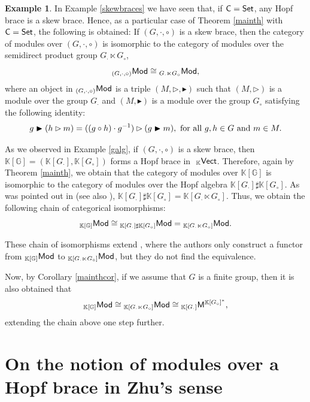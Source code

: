\documentclass[11pt,reqno]{amsart}
\theoremstyle{plain}%
\theoremstyle{definition}
\newtheorem{example}[theorem]{Example}%
\theoremstyle{remark}
\begin{document}
\begin{example}
	In Example \ref{skewbraces} we have seen that, if ${\sf C}={\sf Set}$, any Hopf brace is a skew brace. Hence, as a particular case of Theorem \ref{mainth} with ${\sf C}={\sf Set}$, the following is obtained: If $(G,\cdot,\circ)$ is a skew brace, then the category of modules over $(G,\cdot,\circ)$ is isomorphic to the category of modules over the semidirect product group $G_{\cdot}\ltimes G_{\circ}$, $${}_{(G,\cdot,\circ)}{\sf Mod}\cong{}_{G_{\cdot}\ltimes G_{\circ}}{\sf Mod},$$
	where an object in ${}_{(G,\cdot,\circ)}{\sf Mod}$ is a triple $(M,\rhd,\blacktriangleright)$ such that $(M,\rhd)$ is a module over the group $G_{\cdot}$ and $(M,\blacktriangleright)$ is a module over the group $G_{\circ}$ satisfying the following identity: 
	\[g\blacktriangleright(h\rhd m)=((g\circ h)\cdot g^{-1})\rhd(g\blacktriangleright m),\textnormal{ for all }g,h\in G\textnormal{ and }m\in M.\]
	
As we observed in Example \ref{galg},  if $(G,\cdot,\circ)$ is a skew brace, then  $\mathbb{K}[\mathbb{G}]=(\mathbb{K}[G_{\cdot}],\mathbb{K}[G_{\circ}])$ forms a Hopf brace in $\;_{\mathbb{K}}{\sf Vect}$. Therefore, again by Theorem \ref{mainth}, we obtain that the category of modules over $\mathbb{K}[\mathbb{G}]$ is isomorphic to the category of modules over the Hopf algebra $\mathbb{K}[G_{\cdot}]\sharp \mathbb{K}[G_{\circ}]$. As was pointed out in \cite[Example 3.14]{Maj} (see also \cite{Tak}), $\mathbb{K}[G_{\cdot}]\sharp \mathbb{K}[G_{\circ}]=\mathbb{K}[G_{\cdot}\ltimes G_{\circ}]$. Thus, we obtain the following chain of categorical isomorphisms:
\[{}_{\mathbb{K}[\mathbb{G}]}{\sf Mod}\cong {}_{\mathbb{K}[G_{\cdot}]\sharp \mathbb{K}[G_{\circ}]}{\sf Mod}={}_{\mathbb{K}[G_{\cdot}\ltimes G_{\circ}]}{\sf Mod}.\]

These chain of isomorphisms extend \cite[Remarks 2.2 and 3.2]{KOZTSANG}, where the authors only construct a functor from ${}_{\mathbb{K}[\mathbb{G}]}{\sf Mod}$ to ${}_{\mathbb{K}[G_{\cdot}\ltimes G_{\circ}]}{\sf Mod}$, but they do not find the equivalence. 



Now, by Corollary \ref{mainthcor}, if we assume that $G$ is a finite group, then it is also obtained that
\[{}_{\mathbb{K}[\mathbb{G}]}{\sf Mod}\cong {}_{\mathbb{K}[G_{\cdot}\ltimes G_{\circ}]}{\sf Mod}\cong {}_{\mathbb{K}[G_{\cdot}]}{\sf M}^{{\mathbb{K}[G_{\circ}]}^{\ast}},\]
extending the chain above one step further.
\end{example}
\section{On the notion of modules over a Hopf brace in Zhu's sense}
\label{comparison}
\end{document}

